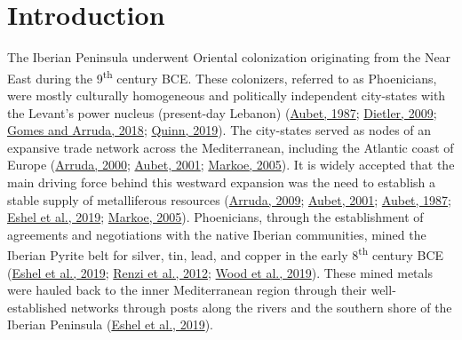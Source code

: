 \documentclass[preprint, 3p, authoryear]{elsarticle} %
\begin{document}
\begin{frontmatter}
 \end{frontmatter}

\hypertarget{introduction}{%
\section{Introduction}\label{introduction}}

The Iberian Peninsula underwent Oriental colonization originating from the Near East during the 9\textsuperscript{th} century BCE. These colonizers, referred to as Phoenicians, were mostly culturally homogeneous and politically independent city-states with the Levant's power nucleus (present-day Lebanon) (\protect\hyperlink{ref-aubet87}{Aubet, 1987}; \protect\hyperlink{ref-dietler09}{Dietler, 2009}; \protect\hyperlink{ref-gomes_arruda18}{Gomes and Arruda, 2018}; \protect\hyperlink{ref-quinn19}{Quinn, 2019}). The city-states served as nodes of an expansive trade network across the Mediterranean, including the Atlantic coast of Europe (\protect\hyperlink{ref-arruda00}{Arruda, 2000}; \protect\hyperlink{ref-aubet01}{Aubet, 2001}; \protect\hyperlink{ref-markoe05}{Markoe, 2005}). It is widely accepted that the main driving force behind this westward expansion was the need to establish a stable supply of metalliferous resources (\protect\hyperlink{ref-arruda09}{Arruda, 2009}; \protect\hyperlink{ref-aubet01}{Aubet, 2001}; \protect\hyperlink{ref-aubet87}{Aubet, 1987}; \protect\hyperlink{ref-eshel_etal19}{Eshel et al., 2019}; \protect\hyperlink{ref-markoe05}{Markoe, 2005}). Phoenicians, through the establishment of agreements and negotiations with the native Iberian communities, mined the Iberian Pyrite belt for silver, tin, lead, and copper in the early 8\textsuperscript{th} century BCE (\protect\hyperlink{ref-eshel_etal19}{Eshel et al., 2019}; \protect\hyperlink{ref-renzi_etal12}{Renzi et al., 2012}; \protect\hyperlink{ref-wood_etal19}{Wood et al., 2019}). These mined metals were hauled back to the inner Mediterranean region through their well-established networks through posts along the rivers and the southern shore of the Iberian Peninsula (\protect\hyperlink{ref-eshel_etal19}{Eshel et al., 2019}).
\end{document}

